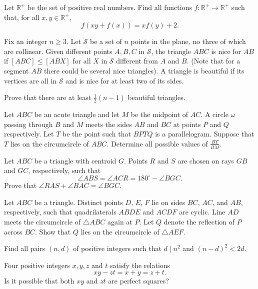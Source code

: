\documentclass[11pt]{scrartcl}
\begin{document}
\begin{problem}[437645166165639]
Let $\mathbb{R}^+$ be the set of positive real numbers. Find all functions $f \colon \mathbb{R}^+ \to \mathbb{R}^+$ such that, for all $x,y \in \mathbb{R}^+$,
$$f(xy+f(x))=xf(y)+2.$$
\end{problem}
\begin{problem}[9000483733039705317]
Fix an integer $n \geq 3$. Let $\mathcal{S}$ be a set of $n$ points in the plane, no three of which are collinear. Given different points $A,B,C$ in $\mathcal{S}$, the triangle $ABC$ is nice for $AB$ if $[ABC] \leq [ABX]$ for all $X$ in $\mathcal{S}$ different from $A$ and $B$. (Note that for a segment $AB$ there could be several nice triangles). A triangle is beautiful if its vertices are all in $\mathcal{S}$ and is nice for at least two of its sides.

Prove that there are at least $\frac{1}{2}(n-1)$ beautiful triangles.
\end{problem}
\begin{problem}[6438524243840428787]
	Let $ABC$ be an acute triangle and let $M$ be the midpoint of $AC$. A circle $\omega$ passing through $B$ and $M$ meets the sides $AB$ and $BC$ at points $P$ and $Q$ respectively. Let $T$ be the point such that $BPTQ$ is a parallelogram. Suppose that $T$ lies on the circumcircle of $ABC$. Determine all possible values of $\frac{BT}{BM}$.
\end{problem}
\begin{problem}[284109588966873]
	Let $ABC$ be a triangle with centroid $G$. Points $R$ and $S$ are chosen on rays $GB$ and $GC$, respectively, such that
\[ \angle ABS=\angle ACR=180^\circ-\angle BGC.\]Prove that $\angle RAS+\angle BAC=\angle BGC$.
\end{problem}
\begin{problem}[9162230842142232349]
Let $ABC$ be a triangle. Distinct points $D$, $E$, $F$ lie on sides $BC$, $AC$, and $AB$, respectively, such that quadrilaterals $ABDE$ and $ACDF$ are cyclic. Line $AD$ meets the circumcircle of $\triangle ABC$ again at $P$. Let $Q$ denote the reflection of $P$ across $BC$. Show that $Q$ lies on the circumcircle of $\triangle AEF$.
\end{problem}
\begin{problem}[856916153770874]
	Find all pairs $(n,d)$ of positive integers such that $d\mid n^2$ and $(n-d)^2<2d$.
\end{problem}
\begin{problem}[4678973565823282552]
Four positive integers $x,y,z$ and $t$ satisfy the relations
\[ xy - zt = x + y = z + t. \]Is it possible that both $xy$ and $zt$ are perfect squares?
\end{problem}
\end{document}

